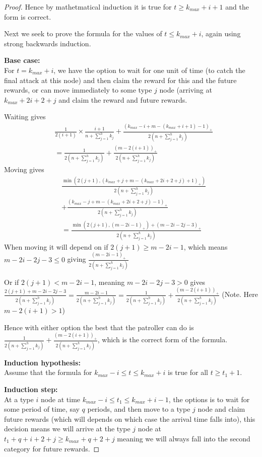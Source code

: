 \documentclass[a4paper,10pt]{article}
\newcommand{\denominator}{\ensuremath{n+\sum\limits_{j=1}^{h} k_{j}}}
\newcommand{\pospart}[1]{\left( #1 \right)_{+}}
\theoremstyle{definition}
\theoremstyle{definition}
\theoremstyle{remark}
\theoremstyle{definition}
\begin{document}
\begin{proof}
Hence by mathetmatical induction it is true for $t \geq k_{max}+i+1$ and the form is correct.

Next we seek to prove the formula for the values of $t \leq k_{max}+i$, again using strong backwards induction.

\textbf{Base case:}
\\
For $t=k_{max}+i$, we have the option to wait for one unit of time (to catch the final attack at this node) and then claim the reward for this and the future rewards, or can move immediately to some type $j$ node (arriving at $k_{max}+2i+2+j$ and claim the reward and future rewards.

Waiting gives
\begin{align*}
&\frac{1}{2(i+1)} \times \frac{i+1}{\denominator} +\frac{\pospart{k_{max}-i+m-(k_{max}+i+1)-1}}{2 \left( \denominator \right)} \\
&=\frac{1}{2 \left( \denominator \right)}+\frac{\pospart{m-2(i+1)}}{2 \left( \denominator \right)}
\end{align*}
Moving gives
\begin{align*}
&\frac{\min (2(j+1), \pospart{k_{max}+j+m-(k_{max}+2i+2+j)+1})}{2 \left( \denominator \right)} \\
&+\frac{\pospart{k_{max}-j+m-(k_{max}+2i+2+j)-1}}{2 \left( \denominator \right)} \\
&=\frac{\min (2(j+1),\pospart{m-2i-1})+\pospart{m-2i-2j-3}}{2 \left( \denominator \right)}
\end{align*}
When moving it will depend on if $2(j+1) \geq m-2i-1$, which means $m-2i-2j-3 \leq 0$
giving $\frac{\pospart{m-2i-1}}{2 \left( \denominator \right)}$

Or if $2(j+1) < m-2i-1$, meaning $m-2i-2j-3 >0$ gives $\frac{2(j+1)+m-2i-2j-3}{2 \left( \denominator \right)}=\frac{m-2i-1}{2 \left( \denominator \right)}=\frac{1}{2 \left( \denominator \right)}+\frac{\pospart{m-2(i+1)}}{2 \left( \denominator \right)}$ (Note. Here $m-2(i+1) > 1$)

Hence with either option the best that the patroller can do is
$\frac{1}{2 \left( \denominator \right)}+\frac{\pospart{m-2(i+1)}}{2 \left( \denominator \right)}$, which is the correct form of the formula.

\textbf{Induction hypothesis:}
\\
Assume that the formula for $k_{max}-i \leq t \leq k_{max}+i$ is true for all $t \geq t_{1}+1$.

\textbf{Induction step:}
\\
At a type $i$ node at time $k_{max}-i \leq t_{1} \leq k_{max}+i-1$, the options is to wait for some period of time, say $q$ periods, and then move to a type $j$ node and claim future rewards (which will depends on which case the arrival time falls into), this decision means we will arrive at the type $j$ node at $t_{1}+q+i+2+j \geq k_{max}+q+2+j$ meaning we will always fall into the second category for future rewards.


\end{proof}
\end{document}
